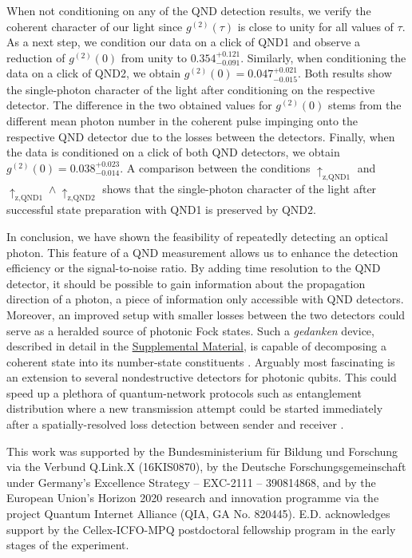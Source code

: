 \documentclass[prl,twocolumn,amsmath,amssymb,bibnotes,aps,longbibliography]{revtex4-1}
\begin{document}
When not conditioning on any of the QND detection results, we verify the coherent character of our light since $g^{(2)}(\tau)$ is close to unity for all values of $\tau$. As a next step, we condition our data on a click of QND1 and observe a reduction of $g^{(2)}(0)$ from unity to $0.354^{+0.121}_{-0.091}$. Similarly, when conditioning the data on a click of QND2, we obtain $g^{(2)}(0)=0.047^{+0.021}_{-0.015}$. Both results show the single-photon character of the light after conditioning on the respective detector. The difference in the two obtained values for $g^{(2)}(0)$ stems from the different mean photon number in the coherent pulse impinging onto the respective QND detector due to the losses between the detectors. Finally, when the data is conditioned on a click of both QND detectors, we obtain $g^{(2)}(0)=0.038^{+0.023}_{-0.014}$. A comparison between the conditions $\uparrow_{\text{z,QND1}}$ and $\uparrow_{\text{z,QND1}}\land\uparrow_{\text{z,QND2}}$ shows that the single-photon character of the light after successful state preparation with QND1 is preserved by QND2. 

In conclusion, we have shown the feasibility of repeatedly detecting an optical photon. This feature of a QND measurement allows us to enhance the detection efficiency or the signal-to-noise ratio. By adding time resolution to the QND detector, it should be possible to gain information about the propagation direction of a photon, a piece of information only accessible with QND detectors. Moreover, an improved setup with smaller losses between the two detectors could serve as a heralded source of photonic Fock states. Such a \textit{gedanken} device, described in detail in the \hyperref[supplement]{Supplemental Material}, is capable of decomposing a coherent state into its number-state constituents \cite{guerlin2007}. Arguably most fascinating is an extension to several nondestructive detectors for photonic qubits. This could speed up a plethora of quantum-network \cite{kimble2008,reiserer2015,wehner2018} protocols such as entanglement distribution where a new transmission attempt could be started immediately after a spatially-resolved loss detection between sender and receiver \cite{niemietz2021}.
\begin{acknowledgments}
This work was supported by the Bundesministerium f\"{u}r Bildung und Forschung via the Verbund Q.Link.X (16KIS0870), by the Deutsche Forschungsgemeinschaft under Germany’s Excellence Strategy – EXC-2111 – 390814868, and by the European Union’s Horizon 2020 research and innovation programme via the project Quantum Internet Alliance (QIA, GA No. 820445). E.D. acknowledges support by the Cellex-ICFO-MPQ postdoctoral fellowship program in the early stages of the experiment.
\end{acknowledgments}
\end{document}
